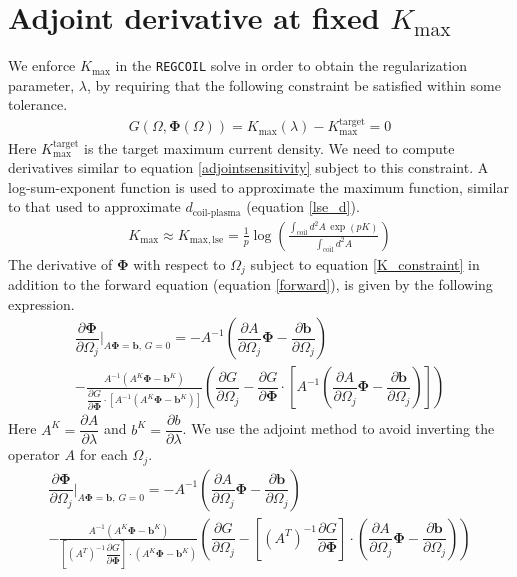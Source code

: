 \documentclass[aps,unsortedaddress]{revtex4-1}
\newcommand{\partder}[2]{\dfrac{\partial  #1}{\partial  #2}}
\begin{document}
\section{Adjoint derivative at fixed $K_{\text{max}}$}
\label{lambda_search}
We enforce $K_{\text{max}}$ in the \texttt{REGCOIL} solve in order to obtain the regularization parameter, $\lambda$, by requiring that the following constraint be satisfied within some tolerance. 
\begin{gather}
G(\Omega, \bm{\Phi}(\Omega)) = K_{\text{max}}(\lambda) - K^{\text{target}}_{\text{max}}  = 0 
\label{K_constraint}
\end{gather}
Here $K^{\text{target}}_{\text{max}}$ is the target maximum current density. We need to compute derivatives similar to equation \ref{adjointsensitivity} subject to this constraint. A log-sum-exponent function is used to approximate the maximum function, similar to that used to approximate $d_{\text{coil-plasma}}$ (equation \ref{lse_d}).
\begin{gather}
K_{\text{max}} \approx K_{\text{max},\, \text{lse}} =  \frac{1}{p} \log \left( \frac{\int_{\text{coil}} d^2 A \,  \exp\left(p K\right)}{ \int_{\text{coil}} d^2 A } \right)
\end{gather}
The derivative of $\bm{\Phi}$ with respect to $\Omega_j$ subject to equation \ref{K_constraint} in addition to the forward equation (equation \ref{forward}), is given by the following expression. 
\begin{multline}
\partder{\bm{\Phi}}{\Omega_j} \bigg \rvert_{A \bm{\Phi} = \bm{b}, \, G = 0} = - A^{-1} \left( \partder{A}{\Omega_j} \bm{\Phi} - \partder{\bm{b}}{\Omega_j} \right)\\ - \frac{A^{-1} \left( A^K \bm{\Phi} - \bm{b}^K \right) }{ \partder{G}{\bm{\Phi}} \cdot \left[ A^{-1} \left( A^K \bm{\Phi} - \bm{b}^K \right) \right] } \left( \partder{G}{\Omega_j} - \partder{G}{\bm{\Phi}} \cdot \left[ A^{-1} \left( \partder{A}{\Omega_j} \bm{\Phi} - \partder{\bm{b}}{\Omega_j} \right) \right] \right) 
\end{multline}
Here $A^K = \partder{A}{\lambda}$ and $b^K = \partder{b}{\lambda}$. We use the adjoint method to avoid inverting the operator $A$ for each $\Omega_j$.
\begin{multline}
\partder{\bm{\Phi}}{\Omega_j} \bigg \rvert_{A \bm{\Phi} = \bm{b}, \, G = 0} = - A^{-1} \left( \partder{A}{\Omega_j} \bm{\Phi} - \partder{\bm{b}}{\Omega_j} \right)\\ - \frac{A^{-1} \left( A^K \bm{\Phi} - \bm{b}^K \right) }{ \left[ \left( A^T \right)^{-1} \partder{G}{\bm{\Phi}} \right] \cdot \left( A^K \bm{\Phi} - \bm{b}^K \right) } \left( \partder{G}{\Omega_j} - \left[ \left( A^T \right)^{-1} \partder{G}{\bm{\Phi}} \right]  \cdot \left( \partder{A}{\Omega_j} \bm{\Phi} - \partder{\bm{b}}{\Omega_j} \right) \right) 
\label{withadjoint}
\end{multline}
\end{document}
